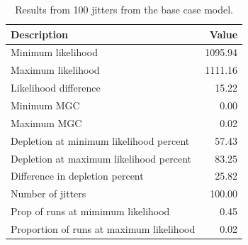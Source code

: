 \documentclass[12pt,]{article}
\begin{document}
\FloatBarrier

\begin{table}[ht]
\centering
\caption{Results from 100 jitters from the base 
                                      case model.} 
\label{tab:jitter}
\begin{tabular}{lr}
  \hline
Description & Value \\ 
  \hline
Minimum likelihood & 1095.94 \\ 
  Maximum likelihood & 1111.16 \\ 
  Likelihood difference & 15.22 \\ 
  Minimum MGC & 0.00 \\ 
  Maximum MGC & 0.02 \\ 
  Depletion at minimum likelihood percent & 57.43 \\ 
  Depletion at maximum likelihood percent & 83.25 \\ 
  Difference in depletion percent & 25.82 \\ 
  Number of jitters & 100.00 \\ 
  Prop of runs at mimimum likelihood & 0.45 \\ 
  Proportion of runs at maximum likelihood & 0.02 \\ 
   \hline
\end{tabular}
\end{table}
\end{document}
